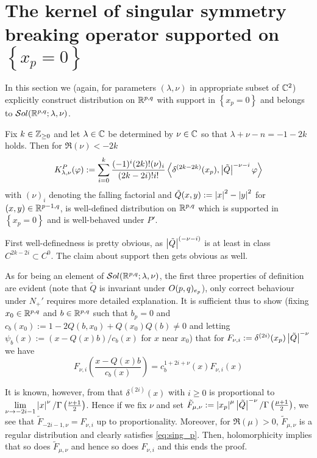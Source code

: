 \documentclass[10pt]{article} %
\theoremstyle{definition}
\theoremstyle{remark}
\begin{document}
\section{The kernel of singular symmetry breaking operator supported on $\left\{ x_p=0 \right\}$}
In this section we (again, for parameters $(\lambda,\nu)$ in appropriate subset of $\mathbb{C}^2$)
explicitly construct distribution on $\mathbb{R}^{p,q}$ with support in $\left\{ x_p=0 \right\}$ and belongs to $\mathcal{S}ol( \mathbb{R}^{p,q};\lambda,\nu)$.
\begin{myprop}
	Fix $k\in\mathbb{Z}_{\ge0}$ and let $\lambda\in\mathbb{C}$ be determined by $\nu\in\mathbb{C}$ so that $\lambda+\nu-n=-1-2k$ holds.
	Then for $\Re(\nu)<-2k$ 
	\[K_{\lambda,\nu}^P(\varphi):=\sum_{i=0}^k\frac{(-1)^i(2k)!(\nu)_i}{(2k-2i)!i!}
		\myabra{\delta^{(2k-2k)}(x_p),\myabs{\tilde{Q}}^{-\nu-i}\varphi}
	\] with $(\nu)_i$ denoting the falling factorial and $\tilde{Q}(x,y):=\left|x\right|^2-\left|y\right|^2$ for $(x,y)\in\mathbb{R}^{p-1,q}$,
	is well-defined distribution on $\mathbb{R}^{p,q}$ which is supported in $\left\{ x_p=0 \right\}$ and is well-behaved
	under $P'$.
\end{myprop}
\begin{myproof}
	First well-definedness is pretty obvious, as $\left|\tilde{Q}\right|^{(-\nu-i)}$ is at least in class $C^{2k-2i}\subset C^0$.
	The claim about support then gets obvious as well.

	As for being an element of $\mathcal{S}ol( \mathbb{R}^{p,q};\lambda,\nu)$, the first three properties of definition are evident (note that $\tilde{Q}$ is
	invariant under $O(p,q)_{e_p}$), only correct behaviour
	under $N_+'$ requires more detailed explanation. It is sufficient thus to show (fixing $x_0\in\mathbb{R}^{p,q}$
	and $b\in\mathbb{R}^{p,q}$ such that $b_p=0$ and $c_b(x_0):=1-2Q(b,x_0)+Q(x_0)Q(b)\neq0$ and letting 
	$\psi_b(x):=(x-Q(x)b)/c_b(x)$ for $x$ near $x_0$) that for $F_{\nu,i}:=\delta^{(2i)}(x_p)\left|\tilde{Q}\right|^{-\nu}$ we have
	\begin{equation}
	F_{\nu,i}\left( \frac{x-Q(x)b}{c_b(x)}\right)=c_b^{1+2i+\nu}(x)F_{\nu,i}(x) 
		\label{eq:sing_p}
	\end{equation}
	
	It is known, however, from \cite[ch. I, sec. 3.5]{gelfand1980distribution}
	that $\delta^{(2i)}(x)$ with $i\geq0$ is proportional to $\lim_{\nu\to-2i-1}\myabs{x}^{\nu}/\Gamma\left( \frac{\nu+1}{2}
	\right)$. Hence if we fix $\nu$ and set $\tilde{F}_{\mu,\nu}:=\left|x_p\right|^{\mu}\left|\tilde{Q}\right|^{-\nu}/\Gamma\left( \frac{\mu
	+1}{2} \right)$, we see that $\tilde{F}_{-2i-1,\nu}=F_{\nu,i}$ up to proportionality. Moreover, for $\Re(\mu)>0$,
	$\tilde{F}_{\mu,\nu}$ is a regular distribution and clearly satisfies \eqref{eq:sing_p}. Then, holomorphicity
	implies that so does $\tilde{F}_{\mu,\nu}$ and hence so does $F_{\nu,i}$ and this ends the proof.
\end{myproof}
\end{document}
